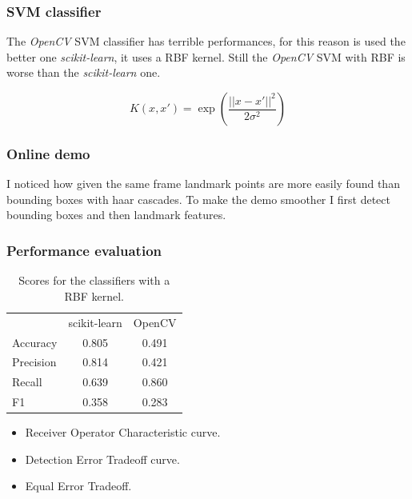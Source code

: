 \documentclass{beamer}
\begin{document}
\begin{frame}
    \frametitle{SVM classifier}
    The \textit{OpenCV} SVM classifier has terrible performances, for this reason is used the better one \textit{scikit-learn}, it uses a RBF kernel.
    Still the \textit{OpenCV} SVM with RBF is worse than the \textit{scikit-learn} one.

    \begin{equation}
        K(x,x') = \exp \left(\frac{||x-x'||^2}{2\sigma^2}\right)
    \end{equation}
\end{frame}

\begin{frame}
    \frametitle{Online demo}
    I noticed how given the same frame landmark points are more easily found than bounding boxes with haar cascades. 
    To make the demo smoother I first detect bounding boxes and then landmark features.
\end{frame}

\begin{frame}
    \frametitle{Performance evaluation}

    \begin{table}[h!t]
        \centering
        \caption{Scores for the classifiers with a RBF kernel.}
        \label{tab:scores}
        \begin{tabular}{lcc}
            & scikit-learn & OpenCV \\
            Accuracy & 0.805 & 0.491 \\
            Precision & 0.814 & 0.421 \\
            Recall & 0.639 & 0.860 \\
            F1 & 0.358 & 0.283 \\
        \end{tabular}
    \end{table}

    \begin{itemize}
        \item Receiver Operator Characteristic curve.
        \item Detection Error Tradeoff curve.
        \item Equal Error Tradeoff.
    \end{itemize}

\end{frame}
\end{document}

